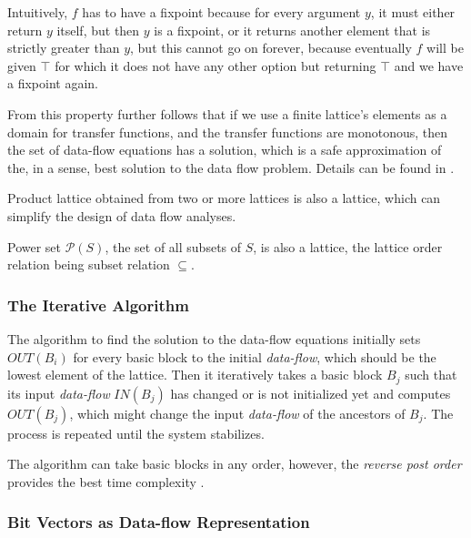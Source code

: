         Intuitively, $f$ has to have a fixpoint because 
        for every argument $y$, it must either return 
        $y$ itself, but then $y$ is a fixpoint, or it 
        returns another element that is strictly 
        greater than $y$, but this cannot go on forever, because eventually 
        $f$ will be given $\top$ for which it does not have 
        any other option but returning $\top$ and we 
        have a fixpoint again.
        
        From this property further follows that if we use a finite 
        lattice's elements as a domain for transfer functions, 
        and the transfer functions are monotonous, then the set of 
        data-flow equations has a solution, which is a safe 
        approximation of the, in a sense, best solution to the 
        data flow problem. Details can be found in \cite{kildall1973unified}.
        
        Product lattice obtained from two or more lattices 
        is also a lattice, which can simplify the design of 
        data flow analyses.

        Power set $\mathcal{P}(S)$, the set of all subsets of $S$, 
        is also a lattice, the lattice order relation 
        being subset relation $\subseteq$.

        \subsubsection*{The Iterative Algorithm}
        
        The algorithm to find the solution to the data-flow equations 
        initially sets $OUT(B_i)$ for every basic block to the initial 
        \emph{data-flow}, which should be the lowest element of the lattice. 
        Then it iteratively takes a basic block $B_j$ such that 
        its input \emph{data-flow} $IN(B_j)$ has changed or is not 
        initialized yet and computes $OUT(B_j)$, which might change 
        the input \emph{data-flow} of the ancestors of $B_j$. 
        The process is repeated until the system stabilizes. 
        
        The algorithm can take basic blocks in any order, however, 
        the \emph{reverse post order} provides the best time complexity 
        \cite{aho1985compilers}.
        
        \subsubsection*{Bit Vectors as Data-flow Representation}

